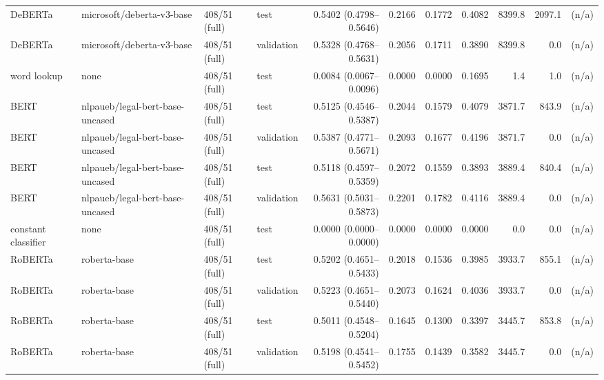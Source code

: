 \begin{tabular}{llllrrrrrrr}
DeBERTa & microsoft/deberta-v3-base & 408/51 (full) & test & 0.5402 (0.4798--0.5646) & 0.2166 & 0.1772 & 0.4082 & 8399.8 & 2097.1 &  (n/a) \\
DeBERTa & microsoft/deberta-v3-base & 408/51 (full) & validation & 0.5328 (0.4768--0.5631) & 0.2056 & 0.1711 & 0.3890 & 8399.8 & 0.0 &  (n/a) \\
word lookup & none & 408/51 (full) & test & 0.0084 (0.0067--0.0096) & 0.0000 & 0.0000 & 0.1695 & 1.4 & 1.0 &  (n/a) \\
BERT & nlpaueb/legal-bert-base-uncased & 408/51 (full) & test & 0.5125 (0.4546--0.5387) & 0.2044 & 0.1579 & 0.4079 & 3871.7 & 843.9 &  (n/a) \\
BERT & nlpaueb/legal-bert-base-uncased & 408/51 (full) & validation & 0.5387 (0.4771--0.5671) & 0.2093 & 0.1677 & 0.4196 & 3871.7 & 0.0 &  (n/a) \\
BERT & nlpaueb/legal-bert-base-uncased & 408/51 (full) & test & 0.5118 (0.4597--0.5359) & 0.2072 & 0.1559 & 0.3893 & 3889.4 & 840.4 &  (n/a) \\
BERT & nlpaueb/legal-bert-base-uncased & 408/51 (full) & validation & 0.5631 (0.5031--0.5873) & 0.2201 & 0.1782 & 0.4116 & 3889.4 & 0.0 &  (n/a) \\
constant classifier & none & 408/51 (full) & test & 0.0000 (0.0000--0.0000) & 0.0000 & 0.0000 & 0.0000 & 0.0 & 0.0 &  (n/a) \\
RoBERTa & roberta-base & 408/51 (full) & test & 0.5202 (0.4651--0.5433) & 0.2018 & 0.1536 & 0.3985 & 3933.7 & 855.1 &  (n/a) \\
RoBERTa & roberta-base & 408/51 (full) & validation & 0.5223 (0.4651--0.5440) & 0.2073 & 0.1624 & 0.4036 & 3933.7 & 0.0 &  (n/a) \\
RoBERTa & roberta-base & 408/51 (full) & test & 0.5011 (0.4548--0.5204) & 0.1645 & 0.1300 & 0.3397 & 3445.7 & 853.8 &  (n/a) \\
RoBERTa & roberta-base & 408/51 (full) & validation & 0.5198 (0.4541--0.5452) & 0.1755 & 0.1439 & 0.3582 & 3445.7 & 0.0 &  (n/a) \\
\bottomrule
\end{tabular}
